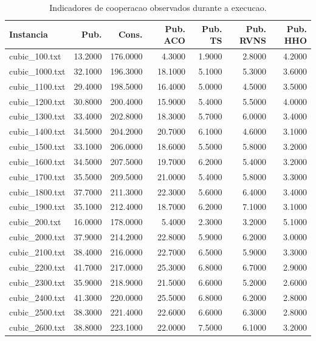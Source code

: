 \begin{table}[h!]
\centering
\caption{Indicadores de cooperacao observados durante a execucao.}
\label{tab:indicadores-cooperacao}
\scriptsize
\setlength{\tabcolsep}{4pt}
\renewcommand{\arraystretch}{1.15}
\begin{tabular}{lrrrrrr}
\hline
\textbf{Instancia} & \textbf{Pub.} & \textbf{Cons.} & \textbf{Pub. ACO} & \textbf{Pub. TS} & \textbf{Pub. RVNS} & \textbf{Pub. HHO} \\
\hline
cubic_100.txt & 13.2000 & 176.0000 & 4.3000 & 1.9000 & 2.8000 & 4.2000 \\
cubic_1000.txt & 32.1000 & 196.3000 & 18.1000 & 5.1000 & 5.3000 & 3.6000 \\
cubic_1100.txt & 29.4000 & 198.5000 & 16.4000 & 5.0000 & 4.5000 & 3.5000 \\
cubic_1200.txt & 30.8000 & 200.4000 & 15.9000 & 5.4000 & 5.5000 & 4.0000 \\
cubic_1300.txt & 33.4000 & 202.8000 & 18.3000 & 5.7000 & 6.0000 & 3.4000 \\
cubic_1400.txt & 34.5000 & 204.2000 & 20.7000 & 6.1000 & 4.6000 & 3.1000 \\
cubic_1500.txt & 33.1000 & 206.0000 & 18.6000 & 5.5000 & 5.8000 & 3.2000 \\
cubic_1600.txt & 34.5000 & 207.5000 & 19.7000 & 6.2000 & 5.4000 & 3.2000 \\
cubic_1700.txt & 35.5000 & 209.5000 & 21.0000 & 5.4000 & 5.8000 & 3.3000 \\
cubic_1800.txt & 37.7000 & 211.3000 & 22.3000 & 5.6000 & 6.4000 & 3.4000 \\
cubic_1900.txt & 35.1000 & 212.4000 & 18.7000 & 6.2000 & 7.1000 & 3.1000 \\
cubic_200.txt & 16.0000 & 178.0000 & 5.4000 & 2.3000 & 3.2000 & 5.1000 \\
cubic_2000.txt & 37.9000 & 214.2000 & 22.8000 & 5.9000 & 6.2000 & 3.0000 \\
cubic_2100.txt & 38.4000 & 216.0000 & 22.7000 & 6.5000 & 5.9000 & 3.3000 \\
cubic_2200.txt & 41.7000 & 217.0000 & 25.3000 & 6.8000 & 6.7000 & 2.9000 \\
cubic_2300.txt & 35.9000 & 218.9000 & 21.5000 & 6.6000 & 5.2000 & 2.6000 \\
cubic_2400.txt & 41.3000 & 220.0000 & 25.5000 & 6.8000 & 6.2000 & 2.8000 \\
cubic_2500.txt & 38.3000 & 221.4000 & 22.6000 & 6.6000 & 6.3000 & 2.8000 \\
cubic_2600.txt & 38.8000 & 223.1000 & 22.0000 & 7.5000 & 6.1000 & 3.2000 \\

\end{tabular}
\end{table}
